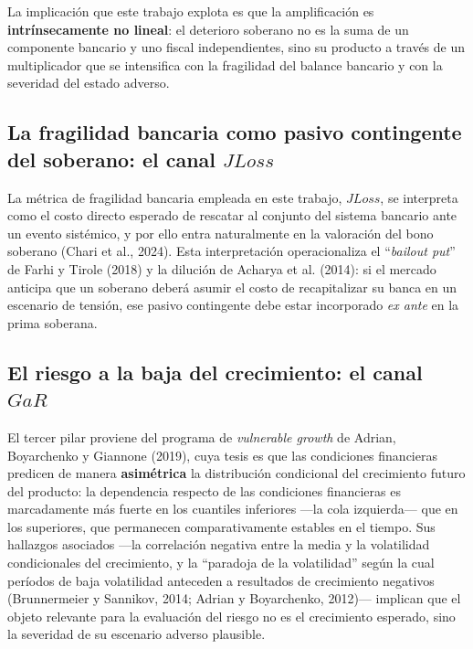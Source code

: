\documentclass[5p,times,twocolumn,authoryear]{elsarticle}
\begin{document}
La implicación que este trabajo explota es que la amplificación es \textbf{intrínsecamente no lineal}: el deterioro soberano no es la suma de un componente bancario y uno fiscal independientes, sino su producto a través de un multiplicador que se intensifica con la fragilidad del balance bancario y con la severidad del estado adverso.

\subsection{La fragilidad bancaria como pasivo contingente del soberano: el canal $JLoss$}

La métrica de fragilidad bancaria empleada en este trabajo, $JLoss$, se interpreta como el costo directo esperado de rescatar al conjunto del sistema bancario ante un evento sistémico, y por ello entra naturalmente en la valoración del bono soberano (Chari et al., 2024). Esta interpretación operacionaliza el ``\textit{bailout put}'' de Farhi y Tirole (2018) y la dilución de Acharya et al. (2014): si el mercado anticipa que un soberano deberá asumir el costo de recapitalizar su banca en un escenario de tensión, ese pasivo contingente debe estar incorporado \textit{ex ante} en la prima soberana.

\subsection{El riesgo a la baja del crecimiento: el canal $GaR$}

El tercer pilar proviene del programa de \textit{vulnerable growth} de Adrian, Boyarchenko y Giannone (2019), cuya tesis es que las condiciones financieras predicen de manera \textbf{asimétrica} la distribución condicional del crecimiento futuro del producto: la dependencia respecto de las condiciones financieras es marcadamente más fuerte en los cuantiles inferiores —la cola izquierda— que en los superiores, que permanecen comparativamente estables en el tiempo. Sus hallazgos asociados —la correlación negativa entre la media y la volatilidad condicionales del crecimiento, y la ``paradoja de la volatilidad'' según la cual períodos de baja volatilidad anteceden a resultados de crecimiento negativos (Brunnermeier y Sannikov, 2014; Adrian y Boyarchenko, 2012)— implican que el objeto relevante para la evaluación del riesgo no es el crecimiento esperado, sino la severidad de su escenario adverso plausible.
\end{document}
